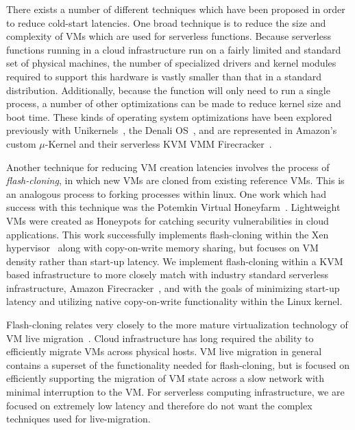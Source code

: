  There exists a number of different
techniques which have been proposed in order to reduce cold-start
latencies. One broad technique is to reduce the size and complexity of VMs
which are used for serverless functions. Because serverless functions running
in a cloud infrastructure run on a fairly limited and standard set of physical
machines, the number of specialized drivers and kernel modules required to
support this hardware is vastly smaller than that in a standard distribution.
Additionally, because the function will only need to run a single process, a
number of other optimizations can be made to reduce kernel size and boot time.
These kinds of operating system optimizations have been explored previously
with Unikernels~\cite{unikernels}, the Denali OS~\cite{denali}, and are
represented in Amazon's custom $\mu$-Kernel and their serverless KVM VMM
Firecracker~\cite{firecracker}.

Another technique for reducing VM creation latencies involves the process of
\emph{flash-cloning}, in which new VMs are cloned from existing reference VMs.
This is an analogous process to forking processes within linux. One work which
had success with this technique was the Potemkin Virtual
Honeyfarm~\cite{potemkin}. Lightweight VMs were created as Honeypots for
catching security vulnerabilities in cloud applications. This work successfully
implements flash-cloning within the Xen hypervisor~\cite{xen} along with
copy-on-write memory sharing, but focuses on VM density rather than start-up
latency. We implement flash-cloning within a KVM based infrastructure to more
closely match with industry standard serverless infrastructure, Amazon
Firecracker~\cite{firecracker}, and with the goals of minimizing start-up
latency and utilizing native copy-on-write functionality within the Linux
kernel.

 Flash-cloning relates very closely to the more
mature virtualization technology of VM live
migration~\cite{post-copy-migration}\cite{snowflock}. Cloud infrastructure has
long required the ability to efficiently migrate VMs across physical hosts. VM
live migration in general contains a superset of the functionality needed for
flash-cloning, but is focused on efficiently supporting the migration of VM
state across a slow network with minimal interruption to the VM. For serverless
computing infrastructure, we are focused on extremely low latency and therefore
do not want the complex techniques used for live-migration.
